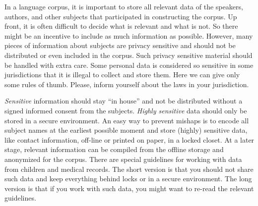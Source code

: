 \documentclass[10pt, a4paper]{article}
\begin{document}
In a language corpus, it is important to store all relevant data of the speakers, authors, and other subjects that participated in constructing the corpus. Up front, it is often difficult to decide what is relevant and what is not. So there might be an incentive to include as much information as possible. However, many pieces of information about subjects are privacy sensitive and should not be distributed or even included in the corpus. Such privacy sensitive material should be handled with extra care. Some personal data is considered so sensitive in some jurisdictions that it is illegal to collect and store them. Here we can give only some rules of thumb. Please, inform yourself about the laws in your jurisdiction. 

\emph{Sensitive} information should stay ``in house'' and not be distributed without a signed informed consent from the subjects. \emph{Highly sensitive} data should only be stored in a secure environment. An easy way to prevent mishaps is to encode all subject names at the earliest possible moment and store (highly) sensitive data, like contact information, off-line or printed on paper, in a locked closet. At a later stage, relevant information can be compiled from the offline storage and anonymized for the corpus. There are special guidelines for working with data from children and medical records. The short version is that you should not share such data and keep everything behind locks or in a secure environment. The long version is that if you work with such data, you might want to re-read the relevant guidelines.
\end{document}
